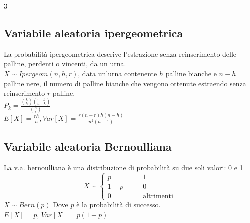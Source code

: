 \documentclass{article}
\begin{document}
\begin{multicols*}{3}
		\subsection{Variabile aleatoria ipergeometrica}
		La probabilità ipergeometrica descrive l'estrazione senza reinserimento delle palline, perdenti o vincenti, da un urna.\\
		\(X\sim Ipergeom(n,h,r)\), data un'urna contenente \(h\) palline bianche e \(n-h\) palline nere, il numero di palline bianche che vengono ottenute estraendo senza reinserimento \(r\) palline.\\
		\(P_k=\frac{\binom{k}{h}\binom{r-h}{n-k}}{\binom{n}{r}}\)\\ 
		\(E[X] = \frac{rh}{n}, Var[X] = \frac{r(n-r)h(n-h)}{n^2(n-1)}\)\\
		
		\subsection{Variabile aleatoria Bernoulliana}
		La v.a. bernoulliana è una distribuzione di probabilità su due soli valori: 0 e 1\\ 
		\begin{equation*}
			X \sim
			\left\{
			\begin{alignedat}{2}
				p  & \qquad 1\\
				1-p  & \qquad 0\\
				0            & \qquad \text{altrimenti}
			\end{alignedat}
			\right.
		\end{equation*}
		\(X \sim Bern(p)\) Dove \(p\) è la probabilità di successo.\\
		\(E[X] = p\), \(Var[X] = p(1-p)\)\\
		
		
		
		
		
		
		
		
		
		
		
		
		 
		
		
		
		
		
		
		
	\end{multicols*}
\end{document}
